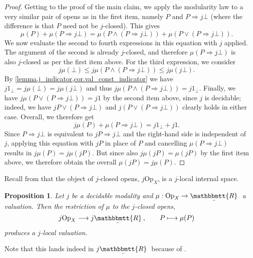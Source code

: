 \documentclass[11pt, oneside, article]{memoir}
\theoremstyle{plain}
\newtheorem{proposition}[theorem]{Proposition}
\theoremstyle{definition}
\theoremstyle{remark}
\newcommand{\Set}[1]{\mathrm{#1}}
\newcommand{\ubar}[1]{\underaccent{\bar}{#1}}
\newcommand{\ind}[1]{1_{#1}}
\newcommand{\internal}[1]{\raisebox{-.03ex}{$\mathbbmtt{#1}$}}
\newcommand{\hs}{\hspace{1.1pt}}
\newcommand{\trr}{\internal{R}\hs}
\newcommand{\tlrr}{\ubar{\trr}\hs}
\newcommand{\Op}{\Set{Op}}
\newcommand{\imp}{\Rightarrow}
\begin{document}
\begin{proof}
	Getting to the proof of the main claim, we apply the modularity law to a very similar pair of opens as in the first item, namely $P$ and $P \Rightarrow j\bot$ (where the difference is that $P$ need not be $j$-closed). This gives
	\[
		\mu(P) + \mu(P \Rightarrow j\bot) = \mu(P \land (P \Rightarrow j\bot)) + \mu(P \lor (P \Rightarrow j\bot)).
	\]
	We now evaluate the second to fourth expressions in this equation with $j$ applied. The argument of the second is already $j$-closed, and therefore $\mu(P \Rightarrow j\bot)$ is also $j$-closed as per the first item above. For the third expression, we consider
	\[
		j \mu(\bot) \le j \mu(P \land (P \Rightarrow j\bot)) \le j \mu(j\bot).
	\]
	By \cref{lemma.j_indicator,cor.val_const_indicator} we have $j \ind{\bot}=j \mu(\bot)=j\mu(j\bot)$ and thus $j \mu(P \land (P \Rightarrow j\bot)) =  j \ind{\bot}$. Finally, we have $j \mu(P \lor (P \Rightarrow j\bot)) = j 1$ by the second item above, since $j$ is decidable; indeed, we have $jP\vee(P\imp j\bot)$ and $j(P \lor (P \Rightarrow j\bot))$ clearly holds in either case. Overall, we therefore get
	\[
		j \mu(P) + \mu(P \Rightarrow j\bot) = j \ind{\bot} + j 1.
	\]
	Since $P \Rightarrow j\bot$ is equivalent to $jP \Rightarrow j\bot$ and the right-hand side is independent of $j$, applying this equation with $jP$ in place of $P$ and cancelling $\mu(P \Rightarrow j\bot)$ results in $j \mu(P) = j \mu(jP)$. But since also $j \mu(jP) = \mu(jP)$ by the first item above, we therefore obtain the overall $\mu(jP) = j \mu(P)$.
\end{proof}

Recall from  that the object of $j$-closed opens, $j \Op_X$, is a $j$-local internal space.

\begin{proposition}
	\label{val_localize}
	Let $j$ be a decidable modality and $\mu : \Op_X \to \tlrr$ a valuation. Then the restriction of $\mu$ to the $j$-closed opens,
	\[
		j \Op_X \longrightarrow j \tlrr, \qquad P \longmapsto \mu(P)
	\]
	produces a $j$-local valuation.
\end{proposition}

Note that this lands indeed in $j \tlrr$ because of .
\end{document}
